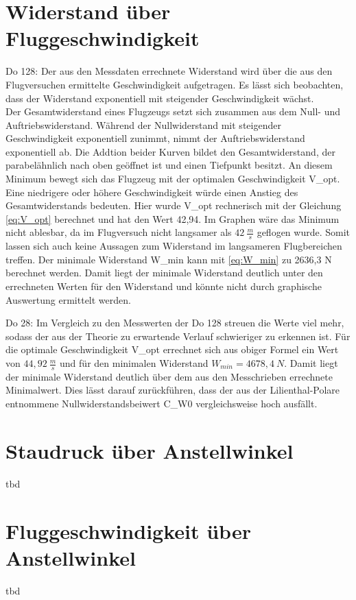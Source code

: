 \section{Widerstand über Fluggeschwindigkeit}
Do 128:
Der aus den Messdaten errechnete Widerstand wird über die aus den Flugversuchen ermittelte Geschwindigkeit aufgetragen. Es lässt sich beobachten, dass der Widerstand exponentiell mit steigender Geschwindigkeit wächst. \\
Der Gesamtwiderstand eines Flugzeugs setzt sich zusammen aus dem Null- und Auftriebswiderstand. Während der Nullwiderstand mit steigender Geschwindigkeit exponentiell zunimmt, nimmt der Auftriebswiderstand exponentiell ab. Die Addtion beider Kurven bildet den Gesamtwiderstand, der parabelähnlich nach oben geöffnet ist und einen Tiefpunkt besitzt. An diesem Minimum bewegt sich das Flugzeug mit der optimalen Geschwindigkeit V_{opt}. Eine niedrigere oder höhere Geschwindigkeit würde einen Anstieg des Gesamtwiderstands bedeuten. Hier wurde V_{opt} rechnerisch mit der Gleichung \ref{eq:V_opt} berechnet und hat den Wert 42,94. Im Graphen wäre das Minimum nicht ablesbar, da im Flugversuch nicht langsamer als $42 \ \frac{m}{s}$ geflogen wurde. Somit lassen sich auch keine Aussagen zum Widerstand im langsameren Flugbereichen treffen. Der minimale Widerstand W_{min} kann mit \ref{eq:W_min} zu 2636,3 N berechnet werden. Damit liegt der minimale Widerstand deutlich unter den errechneten Werten für den Widerstand und könnte nicht durch graphische Auswertung ermittelt werden.

Do 28:
Im Vergleich zu den Messwerten der Do 128 streuen die Werte viel mehr, sodass der aus der Theorie zu erwartende Verlauf schwieriger zu erkennen ist. Für die optimale Geschwindigkeit V_{opt} errechnet sich aus obiger Formel ein Wert von $44,92 \ \frac{m}{s}$ und für den minimalen Widerstand $W_{min}=4678,4 \ N$. Damit liegt der minimale Widerstand deutlich über dem aus den Messchrieben errechnete Minimalwert. Dies lässt darauf zurückführen, dass der aus der Lilienthal-Polare entnommene Nullwiderstandsbeiwert C_{W0} vergleichsweise hoch ausfällt. 


\section{Staudruck über Anstellwinkel}
tbd

\section{Fluggeschwindigkeit über Anstellwinkel}
tbd
